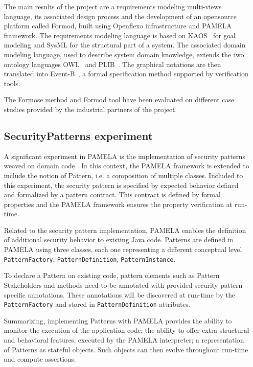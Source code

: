 The main results of the project are a requirements modeling multi-views
language, its associated design process and the development of an opensource
platform called Formod\cite{FormodWebSite}, built using Openflexo
infrastructure and PAMELA framework. 
The requirements modeling language is based on KAOS~\cite{kaos} for goal
modeling and SysML for the structural part of a system. The associated domain
modeling language, used to describe system domain knowledge, extends the two
ontology languages OWL~\cite{owl} and PLIB~\cite{plib}. The graphical notations
are then translated into Event-B~\cite{eventb}, a formal specification method supported by verification tools. 


The Formose method and Formod tool have been evaluated on different case studies provided by the industrial partners of the project.



\subsection{SecurityPatterns experiment}

A significant experiment in PAMELA is the implementation of security patterns weaved on domain code \cite{silva20}.
In this context, the PAMELA framework is extended to include the notion of Pattern, i.e. a composition of multiple classes. Included to this experiment, the security pattern is specified by expected behavior defined and formalized by a pattern contract. This contract is defined by formal properties and the PAMELA framework ensures the property verification at run-time.

Related to the security pattern implementation, PAMELA enables the definition of additional security behavior to existing Java code.
Patterns are defined in PAMELA using three classes, each one representing a different conceptual level \texttt{PatternFactory}, \texttt{PatternDefinition}, \texttt{PatternInstance}.

To declare a Pattern on existing code, pattern elements such as Pattern Stakeholders and methods need to be annotated with provided security pattern-specific annotations. These annotations will be discovered at run-time by the \texttt{PatternFactory} and stored in \texttt{PatternDefinition} attributes.


Summarizing, implementing Patterns with PAMELA provides the ability to monitor the execution of the application code; the ability to offer extra structural and behavioral features, executed by the PAMELA interpreter; a representation of Patterns as stateful objects. Such objects can then evolve throughout run-time and compute assertions.








